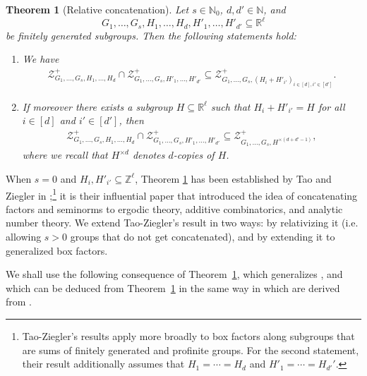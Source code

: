 \documentclass[11pt]{amsart}
\newtheorem{theorem}[lemma]{Theorem}
\theoremstyle{definition}
\newcommand{\N}{{\mathbb N}}
\newcommand{\R}{{\mathbb R}}
\newcommand{\Z}{{\mathbb Z}}
\newcommand{\CZ}{{\mathcal Z}}
\newcommand{\1}{{\mathbf{1}}}
\begin{document}
\begin{theorem}[Relative concatenation]\label{T: relative concatenation}
Let $s\in\N_0$, $d,d'\in\N$, and $$G_1, \ldots, G_s, H_1, \ldots, H_d, H'_1, \ldots, H'_{d'}\subseteq\R^\ell$$ be finitely generated subgroups. Then the following statements hold:
\begin{enumerate}
    \item We have
\begin{align*}
    \mathcal{Z}^+_{G_{1},\dots,G_s,H_{1},\dots,H_{d}}\cap \mathcal{Z}^+_{G_{1},\dots,G_s,H'_{1},\dots,H'_{d'}}\subseteq \mathcal{Z}^+_{G_{1},\dots,G_{s},(H_{i}+H'_{i'})_{i\in[d], i'\in[d']}}.
\end{align*}
    \item If moreover there exists a subgroup $H\subseteq \R^\ell$ such that $H_i + H'_{i'} = H$ for all $i\in[d]$ and $i'\in[d']$, then
\begin{align*}
    \mathcal{Z}^+_{G_{1},\dots,G_s, H_{1},\dots,H_{d}}\cap \mathcal{Z}^+_{G_{1},\dots,G_s, H'_{1},\dots,H'_{d'}} \subseteq \CZ^+_{G_{1},\dots,G_s, H^{\times (d+d'-1)}},
\end{align*}
		where we recall that $H^{\times d}$ denotes $d$-copies of $H$.
\end{enumerate}
\end{theorem}
When $s=0$ and $H_i, H'_{i'}\subseteq\Z^\ell$, Theorem \ref{T: relative concatenation} has been established by Tao and Ziegler in \cite[Theorems 1.15 and 1.16]{TZ16};\footnote{Tao-Ziegler's results apply more broadly to box factors along subgroups that are sums of finitely generated and profinite groups. For the second statement, their result additionally assumes that $H_1 = \cdots = H_d$ and $H'_1 = \cdots = H_{d'}'$.} it is their influential paper that introduced the idea of concatenating factors and seminorms to ergodic theory, additive combinatorics, and analytic number theory. We extend Tao-Ziegler's result in two ways: by relativizing it (i.e. allowing $s>0$ groups that do not get concatenated), and by extending it to generalized box factors.

We shall use the following consequence of Theorem~\ref{T: relative concatenation}, which generalizes \cite[Corollaries~1.20 and 1.21]{TZ16}, and which can be deduced from Theorem~\ref{T: relative concatenation} in the same way in which \cite[Corollaries~1.20 and 1.21]{TZ16} are derived from \cite[Theorems 1.15 and 1.16]{TZ16}.
\end{document}
